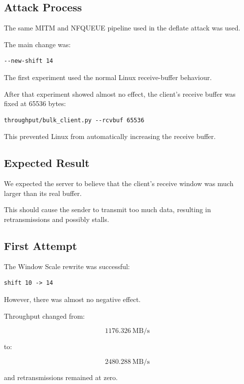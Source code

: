 \documentclass[11pt]{article}
\begin{document}
\subsection{Attack Process}

The same MITM and NFQUEUE pipeline used in the deflate attack was used.

The main change was:

\begin{lstlisting}
--new-shift 14
\end{lstlisting}

The first experiment used the normal Linux receive-buffer behaviour.

After that experiment showed almost no effect, the client's receive
buffer was fixed at 65536 bytes:

\begin{lstlisting}
throughput/bulk_client.py --rcvbuf 65536
\end{lstlisting}

This prevented Linux from automatically increasing the receive buffer.

\subsection{Expected Result}

We expected the server to believe that the client's receive window
was much larger than its real buffer.

This should cause the sender to transmit too much data, resulting in
retransmissions and possibly stalls.

\subsection{First Attempt}

The Window Scale rewrite was successful:

\begin{lstlisting}
shift 10 -> 14
\end{lstlisting}

However, there was almost no negative effect.

Throughput changed from:

\[
1176.326\ \text{MB/s}
\]

to:

\[
2480.288\ \text{MB/s}
\]

and retransmissions remained at zero.
\end{document}
